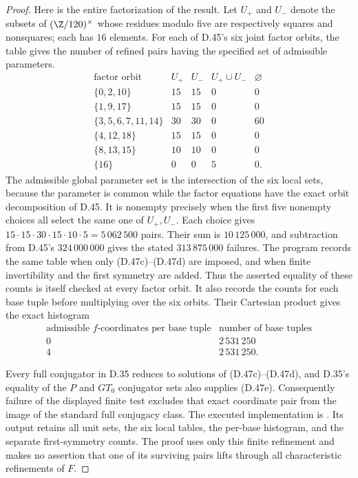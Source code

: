 \begin{proof}
Here is the entire factorization of the result.
Let $U_+$ and $U_-$ denote the subsets of
$(\Z/120)^\times$ whose residues modulo five are
respectively squares and nonsquares; each has
$16$ elements.
For each of D.45's six joint factor orbits, the
table gives the number of refined pairs having
the specified set of admissible parameters.
\[
\begin{array}{c|r|r|r|r}
 \text{factor orbit}&U_+&U_-&U_+\cup U_-&\varnothing\\ \hline
 \{0,2,10\}&15&15&0&0\\
 \{1,9,17\}&15&15&0&0\\
 \{3,5,6,7,11,14\}&30&30&0&60\\
 \{4,12,18\}&15&15&0&0\\
 \{8,13,15\}&10&10&0&0\\
 \{16\}&0&0&5&0.
\end{array}                                               \tag{D.47g}
\]
The admissible global parameter set is the
intersection of the six local sets, because
the parameter is common while the factor
equations have the exact orbit decomposition
of D.45.
It is nonempty precisely when the first five
nonempty choices all select the same one of
$U_+,U_-$.
Each choice gives
$15\cdot15\cdot30\cdot15\cdot10\cdot5
 =5\,062\,500$ pairs.
Their sum is $10\,125\,000$, and subtraction
from D.45's $324\,000\,000$ gives the stated
$313\,875\,000$ failures.
The program records the same table when only
(D.47c)--(D.47d) are imposed, and when finite
invertibility and the first symmetry are added.
Thus the asserted equality of these counts is
itself checked at every factor orbit.
It also records the counts for each base tuple
before multiplying over the six orbits.  Their
Cartesian product gives the exact histogram
\[
 \begin{array}{c|r}
 \text{admissible }f\text{-coordinates per base tuple}
          &\text{number of base tuples}\\ \hline
 0&2\,531\,250\\
 4&2\,531\,250.
 \end{array}                                             \tag{D.47h}
\]

Every full conjugator in D.35 reduces to solutions
of (D.47c)--(D.47d), and D.35's equality of the
$P$ and $GT_0$ conjugator sets also supplies
(D.47e).
Consequently failure of the displayed finite
test excludes that exact coordinate pair from
the image of the standard full conjugacy class.
The executed implementation is
.
Its output retains all unit sets, the six local
tables, the per-base histogram, and the separate
first-symmetry counts.  The proof uses only this
finite refinement and makes no assertion that
one of its surviving pairs lifts through all
characteristic refinements of $F$.
\end{proof}
